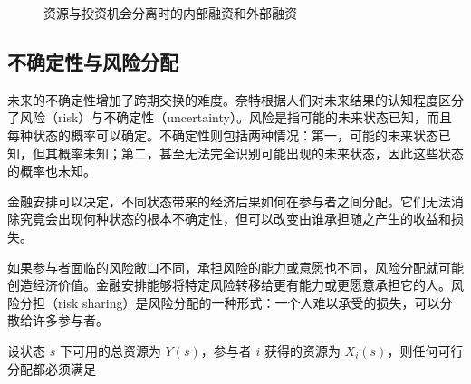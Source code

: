 \begin{figure}[H]

\caption{资源与投资机会分离时的内部融资和外部融资}
\label{fig:ch1-internal-external-finance}
\end{figure}


\subsection{不确定性与风险分配}

未来的不确定性增加了跨期交换的难度。奈特根据人们对未来结果的认知程度区分了风险（risk）与不确定性（uncertainty）。风险是指可能的未来状态已知，而且每种状态的概率可以确定。不确定性则包括两种情况：第一，可能的未来状态已知，但其概率未知；第二，甚至无法完全识别可能出现的未来状态，因此这些状态的概率也未知。

金融安排可以决定，不同状态带来的经济后果如何在参与者之间分配。它们无法消除究竟会出现何种状态的根本不确定性，但可以改变由谁承担随之产生的收益和损失。

如果参与者面临的风险敞口不同，承担风险的能力或意愿也不同，风险分配就可能创造经济价值。金融安排能够将特定风险转移给更有能力或更愿意承担它的人。风险分担（risk sharing）是风险分配的一种形式：一个人难以承受的损失，可以分散给许多参与者。

设状态 $s$ 下可用的总资源为 $Y(s)$，参与者 $i$ 获得的资源为 $X_i(s)$，则任何可行分配都必须满足

